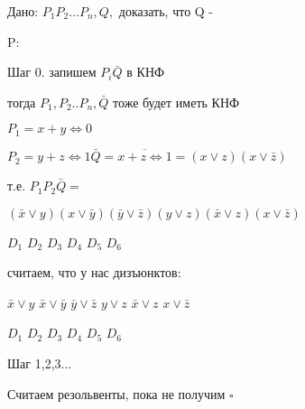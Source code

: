 \documentclass[russian]{lecture-notes}
\begin{document}
    Дано: $P_{1}P_{2} ... P_{n},Q,$ доказать, что Q -

    P:

    Шаг 0. запишем $P_{i} \bar{Q}$ в КНФ

    тогда $P_{1},P_{2}..P_{n},\bar{Q}$ тоже будет иметь КНФ

    \begin{example}
        $P_{1} = x + y \Leftrightarrow 0 $

        $P_{2} = y + z \Leftrightarrow 1 \bar{Q} = \overline{x+z\Leftrightarrow 1} = (x \lor z)(x \lor \bar{z})$

        т.е. $P_{1}P_{2}\bar{Q} = $

        $(\bar{x} \lor y)(x \lor \bar{y})(\bar{y} \lor \bar{z})(y \lor z)(\bar{x} \lor z)(x \lor \bar{z})$

        $D_{1}$ \qquad $D_{2}$ \qquad $D_{3}$ \quad $D_{4}$ \quad $D_{5}$ \quad $D_{6}$

        считаем, что у нас дизъюнктов:

        $\bar{x} \lor y$ \quad $\bar{x} \lor \bar{y}$ \quad $\bar{y} \lor \bar{z}$ \quad $y \lor z$ \quad $\bar{x} \lor z $ \quad $x \lor \bar{z}$

        $D_{1}$ \qquad $D_{2}$ \qquad $D_{3}$ \qquad $D_{4}$ \qquad $D_{5}$ \qquad $D_{6}$

        Шаг 1,2,3...

        Считаем резольвенты, пока не получим $\square$
    \end{example}
\end{document}
